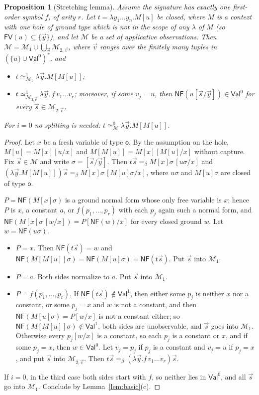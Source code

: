 \documentclass[11pt]{article}
\newcommand{\Ground}{\mathsf{o}\xspace}
\newcommand{\FV}{\mathsf{FV}\xspace}
\newcommand{\NF}{\mathsf{NF}\xspace}
\newcommand{\Val}{\mathsf{Val}\xspace}
\newcommand{\ObsEq}{\mathrel{\simeq}\xspace}
\newtheorem{proposition}[theorem]{Proposition}
\theoremstyle{definition}
\begin{document}
\begin{proposition}[Stretching lemma]\label{prop:stretch}
Assume the signature has exactly one first-order symbol $f$, of arity $r$.
Let $t=\lambda y_1\ldots y_n.M[u]$ be closed, where $M$ is a context with
one hole of ground type which is not in the scope of any $\lambda$ of $M$
(so $\FV(u)\subseteq\{\vec y\}$), and let $\mathcal M$ be a set of
\emph{applicative} observations.  Then
$\mathcal M=\mathcal M_1\cup\bigcup_{\vec v}\mathcal M_{2,\vec v}$, where
$\vec v$ ranges over the finitely many tuples in $(\{u\}\cup\Val^0)^r$,
and
\begin{itemize}
\item $t\ObsEq^1_{\mathcal M_1}\lambda\vec y.M[M[u]]$;
\item $t\ObsEq^1_{\mathcal M_{2,\vec v}}\lambda\vec y.\,f\,v_1\ldots v_r$;
  moreover, if some $v_j=u$, then $\NF(u[\vec s/\vec y])\in\Val^0$ for
  every $\vec s\in\mathcal M_{2,\vec v}$.
\end{itemize}
For $i=0$ no splitting is needed: $t\ObsEq^0_{\mathcal M}\lambda\vec y.M[M[u]]$.
\end{proposition}
\begin{proof}
Let $x$ be a fresh variable of type $\Ground$.  By the assumption on the
hole, $M[u]=M[x][u/x]$ and $M[M[u]]=M[x][M[u]/x]$ without capture.
Fix $\vec s\in\mathcal M$ and write $\sigma=[\vec s/\vec y]$.  Then
$t\vec s=_\beta M[x]\sigma\,[u\sigma/x]$ and
$(\lambda\vec y.M[M[u]])\vec s=_\beta M[x]\sigma\,[M[u]\sigma/x]$, where
$u\sigma$ and $M[u]\sigma$ are closed of type $\Ground$.

$P=\NF(M[x]\sigma)$ is a ground normal form whose only free variable is
$x$; hence $P$ is $x$, a constant $a$, or $f(p_1,\ldots,p_r)$ with each
$p_j$ again such a normal form, and $\NF(M[x]\sigma\,[w/x])=P[\NF(w)/x]$
for every closed ground $w$.  Let $w=\NF(u\sigma)$.
\begin{itemize}
\item $P=x$.  Then $\NF(t\vec s)=w$ and
  $\NF(M[M[u]]\sigma)=\NF(M[u]\sigma)=\NF(t\vec s)$.  Put $\vec s$ into
  $\mathcal M_1$.
\item $P=a$.  Both sides normalize to $a$.  Put $\vec s$ into
  $\mathcal M_1$.
\item $P=f(p_1,\ldots,p_r)$.  If $\NF(t\vec s)\notin\Val^1$, then either
  some $p_j$ is neither $x$ nor a constant, or some $p_j=x$ and $w$ is not
  a constant, and then $\NF(M[u]\sigma)=P[w/x]$ is not a constant either;
  so $\NF(M[M[u]]\sigma)\notin\Val^1$, both sides are unobservable, and
  $\vec s$ goes into $\mathcal M_1$.  Otherwise every $p_j[w/x]$ is a
  constant, so each $p_j$ is a constant or $x$, and if some $p_j=x$, then
  $w\in\Val^0$.  Let $v_j=p_j$ if $p_j$ is a constant and $v_j=u$ if
  $p_j=x$, and put $\vec s$ into $\mathcal M_{2,\vec v}$.  Then
  $t\vec s=_\beta(\lambda\vec y.f\,v_1\ldots v_r)\vec s$.
\end{itemize}
If $i=0$, in the third case both sides start with $f$, so neither lies in
$\Val^0$, and all $\vec s$ go into $\mathcal M_1$.  Conclude by
Lemma~\ref{lem:basic}(c).
\end{proof}
\end{document}
